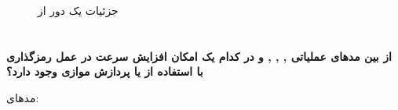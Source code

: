 \documentclass{article}
\begin{document}
\begin{figure}[b]
\begin{center}
\end{center}
\end{figure}

\begin{figure}[b]
\begin{center}
\end{center}
\caption{جزئیات یک دور از }
\end{figure}

\section{}
{\large \textbf{از بین مدهای عملیاتی
,
,
,
و
در کدام یک امکان افزایش سرعت در عمل رمزگذاری با استفاده از
یا پردازش موازی وجود دارد؟}}

مدهای:
\begin{inparaitem}
\item {}
\item {}
\end{inparaitem}
\end{document}

